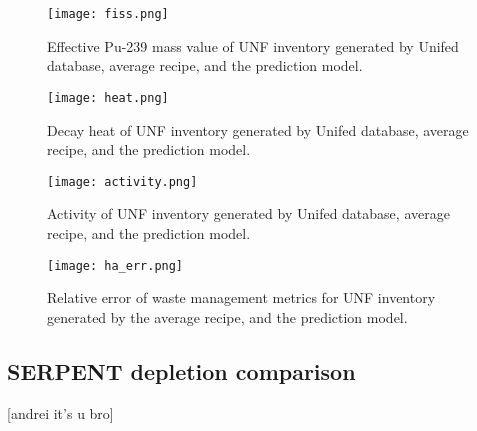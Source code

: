 \begin{figure}
    \centering
    \texttt{[image: fiss.png]}
    \caption{Effective Pu-239 mass value of \gls{UNF} inventory generated by
             Unifed database, average recipe, and the prediction model. }
    \label{fig:fiss}
\end{figure}

\begin{figure}
    \centering
    \texttt{[image: heat.png]}
    \caption{Decay heat of \gls{UNF} inventory generated by
             Unifed database, average recipe, and the prediction model. }
    \label{fig:heat}
\end{figure}

\begin{figure}
    \centering
    \texttt{[image: activity.png]}
    \caption{Activity of \gls{UNF} inventory generated by
             Unifed database, average recipe, and the prediction model. }
    \label{fig:activity}
\end{figure}

\begin{figure}
    \centering
    \texttt{[image: ha\_err.png]}
    \caption{Relative error of waste management metrics for \gls{UNF} inventory
             generated by the average recipe, and the prediction model.}
    \label{fig:ha_err}
\end{figure}


\subsection{SERPENT depletion comparison}

[andrei it's u bro]